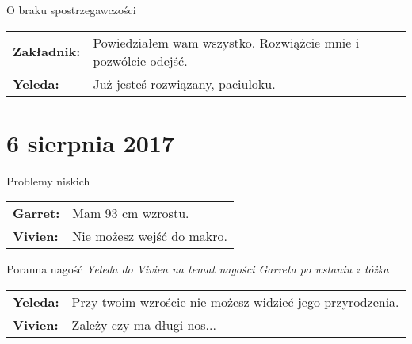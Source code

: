 \documentclass[10pt,twoside,twocolumn]{book}
\begin{document}
\begin{rpg-quotebox}{O braku spostrzegawczości}
   \begin{tabularx}{\columnwidth}{lX}
      \textbf{Zakładnik:} & Powiedziałem wam wszystko. Rozwiążcie mnie i pozwólcie odejść.\\
      \textbf{Yeleda:} & Już jesteś rozwiązany, paciuloku.\\
   \end{tabularx}
\end{rpg-quotebox}


\section*{6 sierpnia 2017}




\begin{rpg-quotebox}{Problemy niskich}
   \begin{tabularx}{\columnwidth}{lX}
      \textbf{Garret:} & Mam 93 cm wzrostu. \\
      \textbf{Vivien:} & Nie możesz wejść do makro.
   \end{tabularx}
\end{rpg-quotebox}


\begin{rpg-quotebox}{Poranna nagość}
   \textit{Yeleda do Vivien na temat nagości Garreta po wstaniu z łóżka}\\

   \begin{tabularx}{\columnwidth}{lX}
      \textbf{Yeleda:} & Przy twoim wzroście nie możesz widzieć jego przyrodzenia. \\
      \textbf{Vivien:} & Zależy czy ma długi nos...
   \end{tabularx}
\end{rpg-quotebox}
\end{document}
